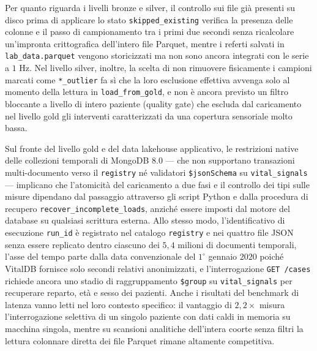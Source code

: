 Per quanto riguarda i livelli bronze e silver, il controllo sui file gi\`a presenti su disco prima di applicare lo stato \texttt{skipped\_existing} verifica la presenza delle colonne e il passo di campionamento tra i primi due secondi senza ricalcolare un'impronta crittografica dell'intero file Parquet, mentre i referti salvati in \texttt{lab\_data.parquet} vengono storicizzati ma non sono ancora integrati con le serie a $1\text{ Hz}$. Nel livello silver, inoltre, la scelta di non rimuovere fisicamente i campioni marcati come \texttt{*\_outlier} fa s\`i che la loro esclusione effettiva avvenga solo al momento della lettura in \texttt{load\_from\_gold}, e non \`e ancora previsto un filtro bloccante a livello di intero paziente (quality gate) che escluda dal caricamento nel livello gold gli interventi caratterizzati da una copertura sensoriale molto bassa.

Sul fronte del livello gold e del data lakehouse applicativo, le restrizioni native delle collezioni temporali di MongoDB 8.0 — che non supportano transazioni multi-documento verso il \texttt{registry} n\'e validatori \texttt{\$jsonSchema} su \texttt{vital\_signals} — implicano che l'atomicit\`a del caricamento a due fasi e il controllo dei tipi sulle misure dipendano dal passaggio attraverso gli script Python e dalla procedura di recupero \texttt{recover\_incomplete\_loads}, anzich\'e essere imposti dal motore del database su qualsiasi scrittura esterna. Allo stesso modo, l'identificativo di esecuzione \texttt{run\_id} \`e registrato nel catalogo \texttt{registry} e nei quattro file JSON senza essere replicato dentro ciascuno dei $5,4$ milioni di documenti temporali, l'asse del tempo parte dalla data convenzionale del $1^\circ$ gennaio $2020$ poich\'e VitalDB fornisce solo secondi relativi anonimizzati, e l'interrogazione \texttt{GET /cases} richiede ancora uno stadio di raggruppamento \texttt{\$group} su \texttt{vital\_signals} per recuperare reparto, et\`a e sesso dei pazienti. Anche i risultati del benchmark di latenza vanno letti nel loro contesto specifico: il vantaggio di $2,2\times$ misura l'interrogazione selettiva di un singolo paziente con dati caldi in memoria su macchina singola, mentre su scansioni analitiche dell'intera coorte senza filtri la lettura colonnare diretta dei file Parquet rimane altamente competitiva.

